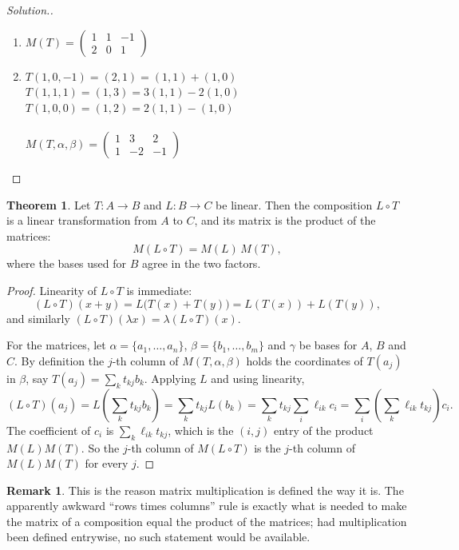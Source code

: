 \documentclass[11pt,a4paper]{article}
\theoremstyle{definition}
\newtheorem{thm}{Theorem}[subsection]
\newtheorem*{remark}{Remark}
\newenvironment{solution}
  {\renewcommand{\qedsymbol}{}\begin{proof}[\textit{Solution}.]}
  {\end{proof}}
\begin{document}
\begin{solution}
\begin{enumerate}
\item[i.] $M(T)=
\begin{pmatrix}
1&1&-1\\2&0&1
\end{pmatrix}
$
\item[ii.] $T(1,0,-1)=(2,1)=(1,1)+(1,0)$ $T(1,1,1)=(1,3)=3(1,1)-2(1,0)$\\ $T(1,0,0)=(1,2)=2(1,1)-(1,0)$\\\\ $M(T,\alpha,\beta)=
\begin{pmatrix}
1&3&2\\1&-2&-1
\end{pmatrix}
$
\end{enumerate}
\end{solution}


\begin{thm}\label{thm:matrix-composition}
Let $T:A\longrightarrow B$ and $L:B\longrightarrow C$ be linear. Then the
composition $L\circ T$ is a linear transformation from $A$ to $C$, and its
matrix is the product of the matrices:
$$M(L\circ T)=M(L)\,M(T),$$
where the bases used for $B$ agree in the two factors.
\end{thm}

\begin{proof}
Linearity of $L\circ T$ is immediate:
$$ (L\circ T)(x+y)=L\big(T(x)+T(y)\big)=L(T(x))+L(T(y)),$$
and similarly $(L\circ T)(\lambda x)=\lambda (L\circ T)(x)$.

For the matrices, let $\alpha=\{a_1,\dots,a_n\}$, $\beta=\{b_1,\dots,b_m\}$ and
$\gamma$ be bases for $A$, $B$ and $C$. By definition the $j$-th column of
$M(T,\alpha,\beta)$ holds the coordinates of $T(a_j)$ in $\beta$, say
$T(a_j)=\sum_k t_{kj}b_k$. Applying $L$ and using linearity,
$$(L\circ T)(a_j)=L\left(\sum_k t_{kj}b_k\right)=\sum_k t_{kj}L(b_k)
=\sum_k t_{kj}\sum_i \ell_{ik}c_i=\sum_i\left(\sum_k \ell_{ik}t_{kj}\right)c_i.$$
The coefficient of $c_i$ is $\sum_k \ell_{ik}t_{kj}$, which is the $(i,j)$ entry
of the product $M(L)M(T)$. So the $j$-th column of $M(L\circ T)$ is the $j$-th
column of $M(L)M(T)$ for every $j$.
\end{proof}

\begin{remark}
This is the reason matrix multiplication is defined the way it is. The
apparently awkward ``rows times columns'' rule is exactly what is needed to
make the matrix of a composition equal the product of the matrices; had
multiplication been defined entrywise, no such statement would be available.
\end{remark}
\end{document}
